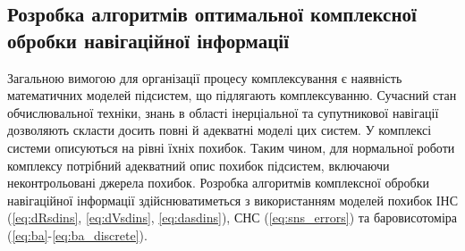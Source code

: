 \subsection{Розробка алгоритмів оптимальної комплексної обробки навігаційної інформації}

Загальною вимогою для організації процесу комплексування є наявність математичних 
моделей підсистем, що підлягають комплексуванню. Сучасний стан обчислювальної техніки, 
знань в області інерціальної та супутникової навігації дозволяють скласти досить 
повні й адекватні моделі цих систем. У комплексі системи описуються на рівні їхніх 
похибок. Таким чином, для нормальної роботи комплексу потрібний адекватний опис похибок 
підсистем, включаючи неконтрольовані джерела похибок. Розробка 
алгоритмів комплексної обробки навігаційної інформації здійснюватиметься з використанням 
моделей похибок ІНС (\eqref{eq:dRsdins}, \eqref{eq:dVsdins}, \eqref{eq:dasdins}), СНС (\eqref{eq:sns_errors}) 
та баровисотоміра (\eqref{eq:ba}-\eqref{eq:ba_discrete}).

